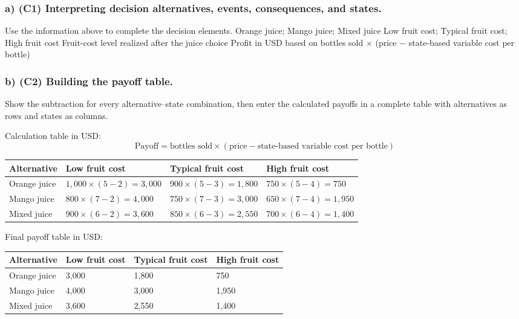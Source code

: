 \subsubsection*{a) \textbf{(C1)} Interpreting decision alternatives, events, consequences, and states.}
\label{subsec:problem6-local-juice-production-c1}
Use the information above to complete the decision elements.
\DecisionElementsTable
{Orange juice; Mango juice; Mixed juice}
{Low fruit cost; Typical fruit cost; High fruit cost}
{Fruit-cost level realized after the juice choice}
{Profit in USD based on bottles sold $\times$ (price $-$ state-based variable cost per bottle)}
\subsubsection*{b) \textbf{(C2)} Building the payoff table.}
\label{subsec:problem6-local-juice-production-c2}
Show the subtraction for every alternative--state combination, then enter the calculated payoffs in a complete table with alternatives as rows and states as columns.

Calculation table in USD:
\[
\text{Payoff}=\text{bottles sold}\times(\text{price}-\text{state-based variable cost per bottle})
\]
\begin{center}
\small
\begin{tabular}{llll}
\toprule
Alternative & Low fruit cost & Typical fruit cost & High fruit cost \\
\midrule
Orange juice & $1{,}000 \times (5 - 2) = 3{,}000$ & $900 \times (5 - 3) = 1{,}800$ & $750 \times (5 - 4) = 750$ \\
Mango juice & $800 \times (7 - 2) = 4{,}000$ & $750 \times (7 - 3) = 3{,}000$ & $650 \times (7 - 4) = 1{,}950$ \\
Mixed juice & $900 \times (6 - 2) = 3{,}600$ & $850 \times (6 - 3) = 2{,}550$ & $700 \times (6 - 4) = 1{,}400$ \\
\bottomrule
\end{tabular}
\end{center}

Final payoff table in USD:
\begin{center}
\begin{tabular}{llll}
\toprule
Alternative & Low fruit cost & Typical fruit cost & High fruit cost \\
\midrule
Orange juice & 3{,}000 & 1{,}800 & 750 \\
Mango juice & 4{,}000 & 3{,}000 & 1{,}950 \\
Mixed juice & 3{,}600 & 2{,}550 & 1{,}400 \\
\bottomrule
\end{tabular}
\end{center}
